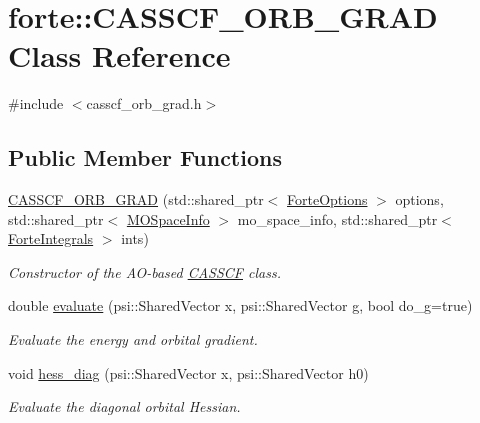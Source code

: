 \hypertarget{classforte_1_1_c_a_s_s_c_f___o_r_b___g_r_a_d}{}\section{forte\+:\+:C\+A\+S\+S\+C\+F\+\_\+\+O\+R\+B\+\_\+\+G\+R\+AD Class Reference}
\label{classforte_1_1_c_a_s_s_c_f___o_r_b___g_r_a_d}


{\ttfamily \#include $<$casscf\+\_\+orb\+\_\+grad.\+h$>$}

\subsection*{Public Member Functions}
\begin{DoxyCompactItemize}
\item 
\mbox{\hyperlink{classforte_1_1_c_a_s_s_c_f___o_r_b___g_r_a_d_ac61ecacaaa036b564784770e14b9cf4a}{C\+A\+S\+S\+C\+F\+\_\+\+O\+R\+B\+\_\+\+G\+R\+AD}} (std\+::shared\+\_\+ptr$<$ \mbox{\hyperlink{classforte_1_1_forte_options}{Forte\+Options}} $>$ options, std\+::shared\+\_\+ptr$<$ \mbox{\hyperlink{classforte_1_1_m_o_space_info}{M\+O\+Space\+Info}} $>$ mo\+\_\+space\+\_\+info, std\+::shared\+\_\+ptr$<$ \mbox{\hyperlink{classforte_1_1_forte_integrals}{Forte\+Integrals}} $>$ ints)
\begin{DoxyCompactList}\small\item\em Constructor of the A\+O-\/based \mbox{\hyperlink{classforte_1_1_c_a_s_s_c_f}{C\+A\+S\+S\+CF}} class. \end{DoxyCompactList}\item 
double \mbox{\hyperlink{classforte_1_1_c_a_s_s_c_f___o_r_b___g_r_a_d_a4dca7f7727dd1db00e53fe8889c6263b}{evaluate}} (psi\+::\+Shared\+Vector x, psi\+::\+Shared\+Vector g, bool do\+\_\+g=true)
\begin{DoxyCompactList}\small\item\em Evaluate the energy and orbital gradient. \end{DoxyCompactList}\item 
void \mbox{\hyperlink{classforte_1_1_c_a_s_s_c_f___o_r_b___g_r_a_d_ae1ec0431b302e773ee96fdb060926888}{hess\+\_\+diag}} (psi\+::\+Shared\+Vector x, psi\+::\+Shared\+Vector h0)
\begin{DoxyCompactList}\small\item\em Evaluate the diagonal orbital Hessian. \end{DoxyCompactList}\item 

\end{DoxyCompactItemize}

